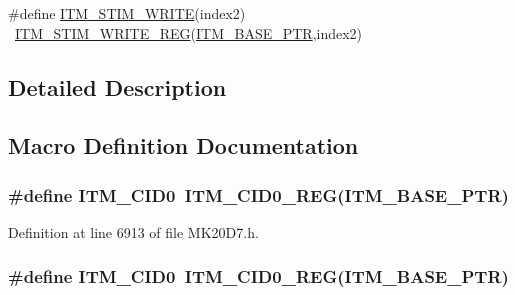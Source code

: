 \begin{DoxyCompactItemize}
\item 
\#define \hyperlink{group___i_t_m___register___accessor___macros_gacdfde2de9665a79e3097f74bd9f3ac29}{I\+T\+M\+\_\+\+S\+T\+I\+M\+\_\+\+W\+R\+I\+TE}(index2)                                  ~\hyperlink{group___i_t_m___register___accessor___macros_ga049ca92a4e78e77c19af81e51aa73f1c}{I\+T\+M\+\_\+\+S\+T\+I\+M\+\_\+\+W\+R\+I\+T\+E\+\_\+\+R\+EG}(\hyperlink{group___i_t_m___peripheral_gafaddee8fe8b6a898d4e5edc43ee0d703}{I\+T\+M\+\_\+\+B\+A\+S\+E\+\_\+\+P\+TR},index2)
\end{DoxyCompactItemize}


\subsection{Detailed Description}


\subsection{Macro Definition Documentation}
\subsubsection[{\texorpdfstring{I\+T\+M\+\_\+\+C\+I\+D0}{ITM_CID0}}]{\setlength{\rightskip}{0pt plus 5cm}\#define I\+T\+M\+\_\+\+C\+I\+D0~{\bf I\+T\+M\+\_\+\+C\+I\+D0\+\_\+\+R\+EG}({\bf I\+T\+M\+\_\+\+B\+A\+S\+E\+\_\+\+P\+TR})}\hypertarget{group___i_t_m___register___accessor___macros_ga8b73e9df0bb82de2161b4dea9c582961}{}\label{group___i_t_m___register___accessor___macros_ga8b73e9df0bb82de2161b4dea9c582961}


Definition at line 6913 of file M\+K20\+D7.\+h.

\subsubsection[{\texorpdfstring{I\+T\+M\+\_\+\+C\+I\+D0}{ITM_CID0}}]{\setlength{\rightskip}{0pt plus 5cm}\#define I\+T\+M\+\_\+\+C\+I\+D0~{\bf I\+T\+M\+\_\+\+C\+I\+D0\+\_\+\+R\+EG}({\bf I\+T\+M\+\_\+\+B\+A\+S\+E\+\_\+\+P\+TR})}\hypertarget{group___i_t_m___register___accessor___macros_ga8b73e9df0bb82de2161b4dea9c582961}{}\label{group___i_t_m___register___accessor___macros_ga8b73e9df0bb82de2161b4dea9c582961}


